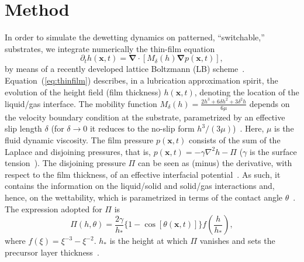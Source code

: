 \section{Method} 
In order to simulate the dewetting dynamics on patterned, ``switchable,'' substrates, we integrate numerically the thin-film equation~\cite{oronLongscaleEvolutionThin1997,crasterDynamicsStabilityThin2009} 
\begin{equation}\label{eq:thinfilm}
    \partial_t h(\mathbf{x},t) = \boldsymbol{\nabla}\cdot\left[M_{\delta}(h)\boldsymbol{\nabla} p(\mathbf{x},t)\right],
\end{equation}
by means of a recently developed lattice Boltzmann (LB) scheme~\cite{zitzLatticeBoltzmannMethod2019,zitzLatticeBoltzmannSimulations2021, zitzSwalbeJlLattice2022}.
Equation~(\ref{eq:thinfilm}) describes, in a lubrication approximation spirit, the evolution of the height field (film thickness) $h(\mathbf{x},t)$, denoting the location of the liquid/gas interface. 
The mobility function $M_{\delta}(h) = \frac{2h^3 + 6\delta h^2 + 3\delta^2 h}{6\mu}$ depends on the velocity boundary condition at the substrate, parametrized by an effective slip length $\delta$ (for $\delta \rightarrow 0$ it reduces to the no-slip form $h^3/(3\mu)$)~\cite{huhHydrodynamicModelSteady1971, peschkaSignaturesSlipDewetting2019, fetzerQuantifyingHydrodynamicSlip2007, munchLubricationModelsSmall2005}. 
Here, $\mu$ is the fluid dynamic viscosity.
The film pressure $p(\mathbf{x},t)$ consists of the sum of the Laplace and disjoining pressures, that is, $p(\mathbf{x},t) = -\gamma \nabla^2 h - \Pi$ ($\gamma$ is the surface tension~\cite{wuHowChemicalPatterns2020}).
The disjoining pressure $\Pi$ can be seen as (minus) the derivative, with respect to the film thickness, of an effective interfacial potential~\cite{DeryaguinChuraev1978}.
As such, it contains the information on the liquid/solid and solid/gas interactions and, hence, on the wettability, which is parametrized in terms of the contact angle $\theta$~\cite{bonnWettingSpreading2009, schwartzSimulationDropletMotion1998, youngIIIEssayCohesion1805, degennesWettingStaticsDynamics1985}. 
The expression adopted for $\Pi$ is
\begin{equation}\label{eq:disjoinpressure}
\Pi(h,\theta) = \frac{2\gamma}{h_{\ast}}\{1-\cos[\theta(\mathbf{x},t)]\}
  f\left(\frac{h}{h_{\ast}}\right),
\end{equation}
where $f(\xi)=\xi^{-3} - \xi^{-2}$. 
$h_{\ast}$ is the height at which $\Pi$ vanishes and sets the precursor layer thickness~\cite{schwartzSimulationDropletMotion1998, mitlinDewettingSolidSurface1993, teletzkeHowLiquidsSpread1987}.
